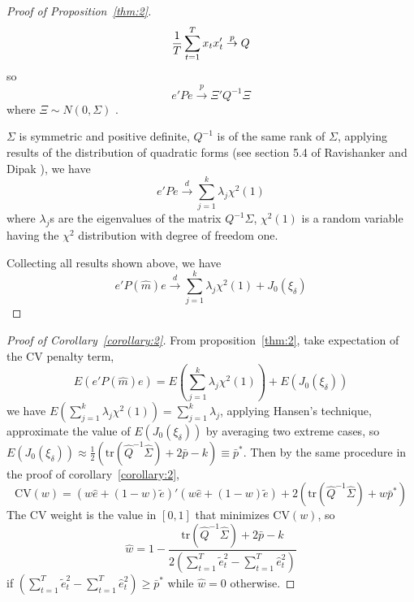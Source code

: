 \begin{proof}[Proof of Proposition~\ref{thm:2}]
    \begin{equation*}
      \frac{1}{T} \sum_{t=1}^{T} x_t x_t' \stackrel{p}{\rightarrow} Q
    \end{equation*}
so
    \begin{equation*}
      e'Pe \stackrel{p}{\rightarrow} \Xi' Q^{-1} \Xi
    \end{equation*}
where $\Xi \sim N(0, \Sigma)$ .

\noindent $\Sigma$ is symmetric and positive definite, $Q^{-1}$ is of the same rank of $\Sigma$, applying results of the distribution of quadratic forms (see section 5.4 of Ravishanker and Dipak \cite{linear_model_textbook}), we have
    \begin{equation*}
      e'Pe \stackrel{d}{\rightarrow} \sum_{j=1}^{k} \lambda_j \chi^2(1)
    \end{equation*}
where $\lambda_j$s are the eigenvalues of the matrix $Q^{-1}\Sigma$, $\chi^2(1)$ is a random variable having the $\chi^2$ distribution with degree of freedom one. 

\noindent Collecting all results shown above, we have
    \begin{equation*}
      e'P(\hat{m})e \stackrel{d}{\rightarrow} \sum_{j=1}^{k} \lambda_j \chi^2(1) + J_0(\xi_{\delta})
    \end{equation*}
\end{proof}

\begin{proof}[Proof of Corollary~\ref{corollary:2}]
From proposition~\ref{thm:2}, take expectation of the CV penalty term,
    \begin{equation*}
      E(e'P(\hat{m})e) = E(\sum_{j=1}^{k} \lambda_j \chi^2(1)) + E(J_0(\xi_{\delta}))
    \end{equation*}
we have $E(\sum_{j=1}^{k} \lambda_j \chi^2(1)) = \sum_{j=1}^{k} \lambda_j$, applying Hansen's technique, approximate the value of $E(J_0(\xi_{\delta}))$ by averaging two extreme cases, so $E(J_0(\xi_{\delta})) \approx \frac{1}{2}(\mathrm{tr}(\hat{Q}^{-1}\hat{\Sigma}) + 2\bar{p} - k) \equiv \bar{p}^{*}$. Then by the same procedure in the proof of corollary~\ref{corollary:2},
    \begin{equation*}
      \mathrm{CV}(w) = (w\hat{e} + (1-w)\tilde{e})'(w\hat{e} + (1-w)\tilde{e}) + 2(\mathrm{tr}(\hat{Q}^{-1}\hat{\Sigma}) + w \bar{p}^{*})
    \end{equation*}
\noindent The CV weight is the value in $[0, 1]$ that minimizes $\mathrm{CV}(w)$, so
    \begin{equation*}
      \hat{w} = 1 - \frac{\mathrm{tr}\left(\hat{Q}^{-1}\hat{\Sigma}\right) + 2\bar{p} - k}{2\left(\sum_{t=1}^{T}\tilde{e}_t^2 - \sum_{t=1}^{T}\hat{e}_t^2\right)}
    \end{equation*}
if $(\sum_{t=1}^{T}\tilde{e}_{t}^{2} - \sum_{t=1}^{T}\hat{e}_{t}^{2}) \geq \bar{p}^{*}$ while $\hat{w} = 0$ otherwise.
\end{proof}
